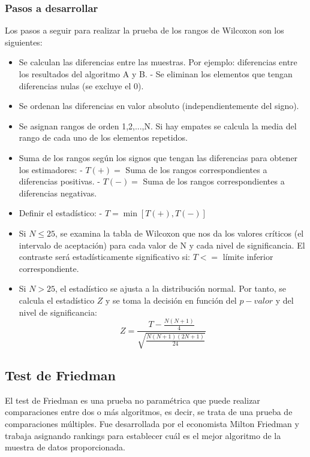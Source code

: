 \subsubsection{Pasos a desarrollar}
Los pasos a seguir para realizar la prueba de los rangos de Wilcoxon son los siguientes:
\begin{itemize}
\item Se calculan las diferencias entre las muestras. Por ejemplo: diferencias entre los resultados del algoritmo
A y B.
\subitem - Se eliminan los elementos que tengan diferencias nulas (se excluye el 0).
\item Se ordenan las diferencias en valor absoluto (independientemente del signo).
\item Se asignan rangos de orden 1,2,...,N. Si hay empates se calcula la media del rango de cada uno de los elementos
repetidos.
\item Suma de los rangos según los signos que tengan las diferencias para obtener los estimadores:
\subitem - $T(+) = $ Suma de los rangos correspondientes a diferencias positivas. 
\subitem - $T(-) = $ Suma de los rangos correspondientes a diferencias negativas.
\item Definir el estadístico:
\subitem - $T = \min [T(+), T(-)]$
\item Si $N \leq 25$, se examina la tabla de Wilcoxon que nos da los valores críticos (el intervalo de aceptación)
para cada valor de N y cada nivel de significancia. El contraste será estadísticamente significativo si: 
$T <= $ límite inferior correspondiente.
\item Si $N > 25$, el estadístico se ajusta a la distribución normal. Por tanto, se calcula el estadístico $Z$ y
se toma la decisión en función del $p-valor$ y del nivel de significancia:
\[ Z = \frac{T-\frac{N(N+1)}{4}}{\sqrt{\frac{N(N+1)(2N+1)}{24}}} \]
\end{itemize}


\subsection{Test de Friedman}
El test de Friedman es una prueba no paramétrica que puede realizar comparaciones entre dos o más algoritmos, es
decir, se trata de una prueba de comparaciones múltiples. Fue desarrollada por el economista Milton Friedman y
trabaja asignando rankings para establecer cuál es el mejor algoritmo de la muestra de datos proporcionada.

